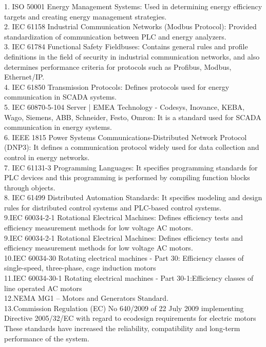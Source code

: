 1. ISO 50001 Energy Management Systems: Used in determining energy efficiency targets and creating energy management strategies.\\
2. IEC 61158 Industrial Communication Networks (Modbus Protocol): Provided standardization of communication between PLC and energy analyzers.\\
3. IEC 61784 Functional Safety Fieldbuses: Contains general rules and profile definitions in the field of security in industrial communication networks, and also determines performance criteria for protocols such as Profibus, Modbus, Ethernet/IP.\\
4. IEC 61850 Transmission Protocols: Defines protocols used for energy communication in SCADA systems.\\
5. IEC 60870-5-104 Server | EMEA Technology - Codesys, Inovance, KEBA, Wago, Siemens, ABB, Schneider, Festo, Omron: It is a standard used for SCADA communication in energy systems.\\
6. IEEE 1815 Power Systems Communications-Distributed Network Protocol (DNP3): It defines a communication protocol widely used for data collection and control in energy networks.\\
7. IEC 61131-3 Programming Languages: It specifies programming standards for PLC devices and this programming is performed by compiling function blocks through objects.\\
8. IEC 61499 Distributed Automation Standards: It specifies modeling and design rules for distributed control systems and PLC-based control systems.\\
9.IEC 60034-2-1 Rotational Electrical Machines: Defines efficiency tests and efficiency measurement methods for low voltage AC motors.\\
9.IEC 60034-2-1 Rotational Electrical Machines: Defines efficiency tests and efficiency measurement methods for low voltage AC motors.\\
10.IEC 60034-30 Rotating electrical machines - Part 30: Efficiency classes of single-speed, three-phase, cage induction motors\\
11.IEC 60034-30-1 Rotating electrical machines - Part 30-1:Efficiency classes of line operated AC motors\\
12.NEMA MG1  – Motors and Generators Standard.\\
13.Commission Regulation (EC) No 640/2009 of 22 July 2009 implementing Directive 2005/32/EC with regard to ecodesign requirements for electric motors
These standards have increased the reliability, compatibility and long-term performance of the system.


